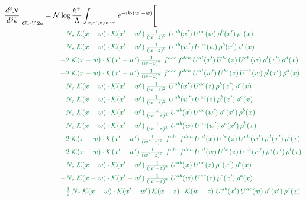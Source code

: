 \documentclass[10pt]{article}
\numberwithin{equation}{section}
\newcommand{\NN}{\mathcal N\log\frac{k^+}{\Lambda}}
\begin{document}
\begin{align}
\frac{d^3N}{d^3k}\bigg|_{G1\text{-}V\,2a}={}&\NN\int_{x,x',z,w,w'}e^{-ik\cdot(w'-w)}\Bigg[\notag\\
&\quad{\color{JIM}+N_c\;\mathcal{K}(x-w)\cdot\mathcal{K}(x'-w')\,\tfrac{1}{(w-z)^{2}}\;U^{ab}(x')\,U^{ac}(w)\,\rho^{b}(x')\,\rho^{c}(x)}\notag\\
&\quad{\color{JIM}-N_c\;\mathcal{K}(x-w)\cdot\mathcal{K}(x'-w')\,\tfrac{1}{(w-z)^{2}}\;U^{ab}(w')\,U^{ac}(w)\,\rho^{b}(x')\,\rho^{c}(x)}\notag\\
&\quad{\color{JIM}-2\;\mathcal{K}(x-w)\cdot\mathcal{K}(x'-w')\,\tfrac{1}{(w-z)^{2}}\;f^{abc}\,f^{deh}\,U^{al}(x')\,U^{be}(z)\,U^{ch}(w)\,\rho^{l}(x')\,\rho^{d}(x)}\notag\\
&\quad{\color{JIM}+2\;\mathcal{K}(x-w)\cdot\mathcal{K}(x'-w')\,\tfrac{1}{(w-z)^{2}}\;f^{abc}\,f^{deh}\,U^{al}(w')\,U^{be}(z)\,U^{ch}(w)\,\rho^{l}(x')\,\rho^{d}(x)}\notag\\
&\quad{\color{JIM}+N_c\;\mathcal{K}(x-w)\cdot\mathcal{K}(x'-w')\,\tfrac{1}{(w-z)^{2}}\;U^{ab}(x')\,U^{ac}(z)\,\rho^{b}(x')\,\rho^{c}(x)}\notag\\
&\quad{\color{JIM}-N_c\;\mathcal{K}(x-w)\cdot\mathcal{K}(x'-w')\,\tfrac{1}{(w-z)^{2}}\;U^{ab}(w')\,U^{ac}(z)\,\rho^{b}(x')\,\rho^{c}(x)}\notag\\
&\quad{\color{JIM}+N_c\;\mathcal{K}(x-w)\cdot\mathcal{K}(x'-w')\,\tfrac{1}{(w'-z)^{2}}\;U^{ab}(x)\,U^{ac}(w')\,\rho^{c}(x')\,\rho^{b}(x)}\notag\\
&\quad{\color{JIM}-N_c\;\mathcal{K}(x-w)\cdot\mathcal{K}(x'-w')\,\tfrac{1}{(w'-z)^{2}}\;U^{ab}(w)\,U^{ac}(w')\,\rho^{c}(x')\,\rho^{b}(x)}\notag\\
&\quad{\color{JIM}-2\;\mathcal{K}(x-w)\cdot\mathcal{K}(x'-w')\,\tfrac{1}{(w'-z)^{2}}\;f^{abc}\,f^{deh}\,U^{al}(x)\,U^{be}(z)\,U^{ch}(w')\,\rho^{d}(x')\,\rho^{l}(x)}\notag\\
&\quad{\color{JIM}+2\;\mathcal{K}(x-w)\cdot\mathcal{K}(x'-w')\,\tfrac{1}{(w'-z)^{2}}\;f^{abc}\,f^{deh}\,U^{al}(w)\,U^{be}(z)\,U^{ch}(w')\,\rho^{d}(x')\,\rho^{l}(x)}\notag\\
&\quad{\color{JIM}+N_c\;\mathcal{K}(x-w)\cdot\mathcal{K}(x'-w')\,\tfrac{1}{(w'-z)^{2}}\;U^{ab}(x)\,U^{ac}(z)\,\rho^{c}(x')\,\rho^{b}(x)}\notag\\
&\quad{\color{JIM}-N_c\;\mathcal{K}(x-w)\cdot\mathcal{K}(x'-w')\,\tfrac{1}{(w'-z)^{2}}\;U^{ab}(w)\,U^{ac}(z)\,\rho^{c}(x')\,\rho^{b}(x)}\notag\\
&\quad{\color{JIM}-\tfrac{1}{2}\,N_c\;\mathcal{K}(x-w)\cdot\mathcal{K}(x'-w')\,\mathcal{K}(x-z)\cdot\mathcal{K}(w-z)\;U^{ab}(x')\,U^{ac}(w)\,\rho^{b}(x')\,\rho^{c}(x)}\notag\\

\end{align}
\end{document}

